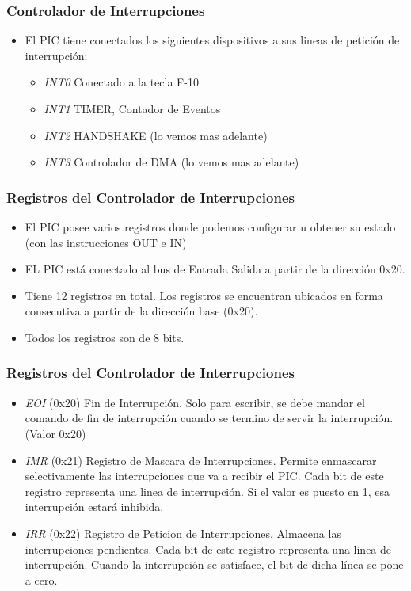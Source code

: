 \documentclass{beamer}
\begin{document}
\begin{frame}
\frametitle{Controlador de Interrupciones}

\begin{itemize}
 \item El PIC tiene conectados los siguientes dispositivos a sus lineas de petición de interrupción:
 \begin{itemize}
  \item \emph{INT0} Conectado a la tecla F-10
  \item \emph{INT1} TIMER, Contador de Eventos
  \item \emph{INT2} HANDSHAKE (lo vemos mas adelante)
  \item \emph{INT3} Controlador de DMA (lo vemos mas adelante)
 \end{itemize}
\end{itemize}

\end{frame}


\begin{frame}
\frametitle{Registros del Controlador de Interrupciones}

\begin{itemize}
 \item El PIC posee varios registros donde podemos configurar u obtener su estado (con las instrucciones OUT e IN)
 \item EL PIC está conectado al bus de Entrada Salida a partir de la dirección 0x20.
 \item Tiene 12 registros en total. Los registros se encuentran ubicados en forma consecutiva a partir de la dirección base (0x20).
 \item Todos los registros son de 8 bits.
\end{itemize}
\end{frame}

\begin{frame}
\frametitle{Registros del Controlador de Interrupciones}

\begin{itemize}
 \item \emph{EOI} (0x20) Fin de Interrupción. Solo para escribir, se debe mandar el comando de fin de interrupción cuando se termino de servir la interrupción. (Valor 0x20)
 \item \emph{IMR} (0x21) Registro de Mascara de Interrupciones. Permite enmascarar selectivamente las interrupciones que va a recibir el PIC. Cada bit de este registro representa una linea de interrupción. Si el valor es puesto en 1, esa interrupción estará inhibida.
 \item \emph{IRR} (0x22) Registro de Peticion de Interrupciones. Almacena las interrupciones pendientes. Cada bit de este registro representa una linea de interrupción. Cuando la interrupción se satisface, el bit de dicha línea se pone a cero.
\end{itemize}

\end{frame}
\end{document}
